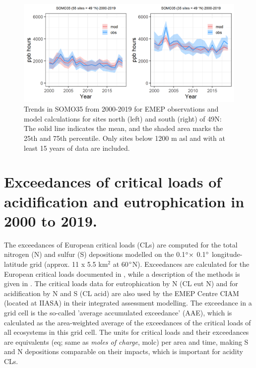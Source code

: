 \begin{figure}[h]
	\centering
	\includegraphics[width=0.74\paperwidth]{FIGS_TRENDS/SOMO35_2000_2019_1200m.png}
	\caption{\label{fig:O3_somo35trends}Trends in SOMO35 from 2000-2019 for EMEP observations and model calculations for sites north (left) and south (right) of 49\degrees N: The solid line indicates the mean, and the shaded area marks the 25th and 75th percentile. Only sites below 1200 m asl and with at least 15 years of data are included.}
\end{figure}



\clearpage
\section{Exceedances of critical loads of acidification and eutrophication in 2000 to 2019.}
\label{subs:exceedSnN}

The exceedances of European critical loads (CLs) are computed for the total nitrogen
(N) and sulfur (S) depositions modelled on the 0.1$^\circ \times$ 0.1$^\circ$
longitude-latitude grid (approx. 11 x 5.5 km$^{2}$ at 60$^\circ$N).
Exceedances are calculated for the European critical loads documented in \cite{Hettelingh:2017}, while
a description of the methods is given in \cite{DeVries:2015}. The
critical loads data for eutrophication by N (CL eut N) and for acidification by N and S
(CL acid) are also used by the EMEP Centre CIAM (located at IIASA) in their integrated assessment
modelling. The exceedance in a grid cell is the so-called ’average accumulated
exceedance’ (AAE), which is calculated as the area-weighted average of the
exceedances of the critical loads of all ecosystems in this grid cell. The units for
critical loads and their exceedances are equivalents (eq; same as \textit{moles of charge},
molc) per area and time, making S and N depositions comparable on their impacts, which is important for
acidity CLs.

